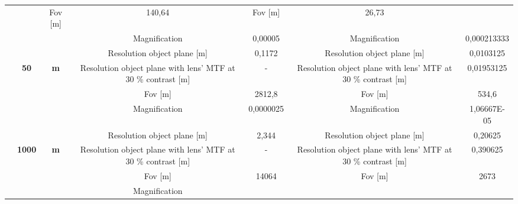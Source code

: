 \begin{table}[H]
{\begin{tabular}{ccc|cc|cc|}
  \cellcolor[HTML]{EFEFEF} &
  \cellcolor[HTML]{EFEFEF} &
  \cellcolor[HTML]{EFEFEF}Fov {[}m{]} &
  \cellcolor[HTML]{EFEFEF}140,64 &
  \cellcolor[HTML]{EFEFEF}Fov {[}m{]} &
  \cellcolor[HTML]{EFEFEF}26,73 \\
\multicolumn{1}{|c|}{} &
  \cellcolor[HTML]{EFEFEF} &
  \cellcolor[HTML]{EFEFEF} &
  Magnification &
  0,00005 &
  Magnification &
  0,000213333 \\
\multicolumn{1}{|c|}{} &
  \cellcolor[HTML]{EFEFEF} &
  \cellcolor[HTML]{EFEFEF} &
  \cellcolor[HTML]{EFEFEF}Resolution object plane {[}m{]} &
  \cellcolor[HTML]{EFEFEF}0,1172 &
  \cellcolor[HTML]{EFEFEF}Resolution object plane {[}m{]} &
  \cellcolor[HTML]{EFEFEF}0,0103125 \\
\multicolumn{1}{|c|}{} &
  \multirow{-4}{*}{\cellcolor[HTML]{EFEFEF}\textbf{50}} &
  \multirow{-4}{*}{\cellcolor[HTML]{EFEFEF}\textbf{m}} &
  Resolution object plane with lens' MTF at 30 \% contrast {[}m{]} &
  - &
  Resolution object plane with lens' MTF at 30 \% contrast {[}m{]} &
  0,01953125 \\ \cline{2-7} 
\multicolumn{1}{|c|}{} &
  \cellcolor[HTML]{EFEFEF} &
  \cellcolor[HTML]{EFEFEF} &
  \cellcolor[HTML]{EFEFEF}Fov {[}m{]} &
  \cellcolor[HTML]{EFEFEF}2812,8 &
  \cellcolor[HTML]{EFEFEF}Fov {[}m{]} &
  \cellcolor[HTML]{EFEFEF}534,6 \\
\multicolumn{1}{|c|}{} &
  \cellcolor[HTML]{EFEFEF} &
  \cellcolor[HTML]{EFEFEF} &
  Magnification &
  0,0000025 &
  Magnification &
  1,06667E-05 \\
\multicolumn{1}{|c|}{} &
  \cellcolor[HTML]{EFEFEF} &
  \cellcolor[HTML]{EFEFEF} &
  \cellcolor[HTML]{EFEFEF}Resolution object plane {[}m{]} &
  \cellcolor[HTML]{EFEFEF}2,344 &
  \cellcolor[HTML]{EFEFEF}Resolution object plane {[}m{]} &
  \cellcolor[HTML]{EFEFEF}0,20625 \\
\multicolumn{1}{|c|}{} &
  \multirow{-4}{*}{\cellcolor[HTML]{EFEFEF}\textbf{1000}} &
  \multirow{-4}{*}{\cellcolor[HTML]{EFEFEF}\textbf{m}} &
  Resolution object plane with lens' MTF at 30 \% contrast {[}m{]} &
  - &
  Resolution object plane with lens' MTF at 30 \% contrast {[}m{]} &
  0,390625 \\ \cline{2-7} 
\multicolumn{1}{|c|}{} &
  \cellcolor[HTML]{EFEFEF} &
  \cellcolor[HTML]{EFEFEF} &
  \cellcolor[HTML]{EFEFEF}Fov {[}m{]} &
  \cellcolor[HTML]{EFEFEF}14064 &
  \cellcolor[HTML]{EFEFEF}Fov {[}m{]} &
  \cellcolor[HTML]{EFEFEF}2673 \\
\multicolumn{1}{|c|}{} &
  \cellcolor[HTML]{EFEFEF} &
  \cellcolor[HTML]{EFEFEF} &
  Magnification &

\end{tabular}}
\end{table}
